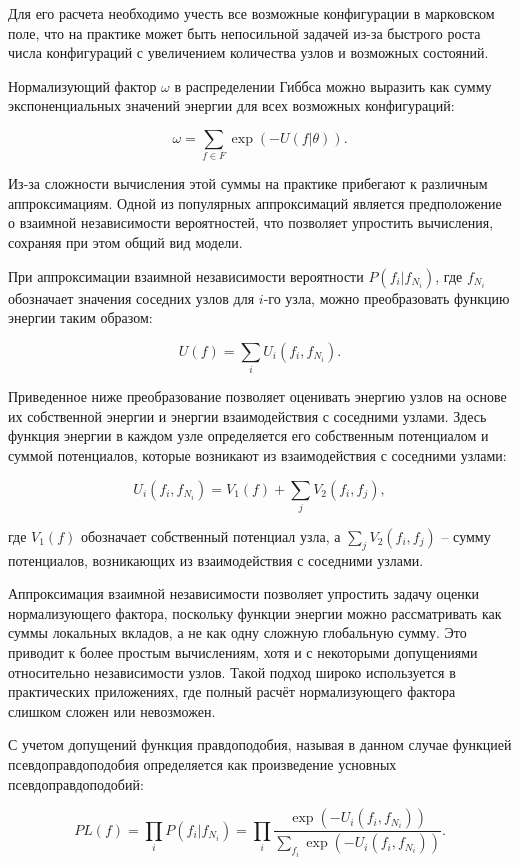 Для его расчета необходимо учесть все возможные конфигурации в марковском поле, что на практике может быть непосильной задачей из-за быстрого роста числа конфигураций с увеличением количества узлов и возможных состояний.

Нормализующий фактор $\omega$ в распределении Гиббса можно выразить как сумму экспоненциальных значений энергии для всех возможных конфигураций:

$$\omega = \sum\limits_{f \in F} \exp (-U(f | \theta)).$$

Из-за сложности вычисления этой суммы на практике прибегают к различным аппроксимациям. Одной из популярных аппроксимаций является предположение о взаимной независимости вероятностей, что позволяет упростить вычисления, сохраняя при этом общий вид модели.

При аппроксимации взаимной независимости вероятности $P(f_i | f_{N_i})$, где $f_{N_i}$ обозначает значения соседних узлов для $i$-го узла, можно преобразовать функцию энергии таким образом:

$$U(f) = \sum\limits_i U_i (f_i, f_{N_i}).$$

Приведенное ниже преобразование позволяет оценивать энергию узлов на основе их собственной энергии и энергии взаимодействия с соседними узлами. Здесь функция энергии в каждом узле определяется его собственным потенциалом и суммой потенциалов, которые возникают из взаимодействия с соседними узлами:

$$U_i (f_i, f_{N_i}) = V_1(f) + \sum\limits_j V_2 (f_i, f_j),$$

где $V_1(f)$ обозначает собственный потенциал узла, а $\sum\limits_j V_2 (f_i, f_j)$ -- сумму потенциалов, возникающих из взаимодействия с соседними узлами.

Аппроксимация взаимной независимости позволяет упростить задачу оценки нормализующего фактора, поскольку функции энергии можно рассматривать как суммы локальных вкладов, а не как одну сложную глобальную сумму. Это приводит к более простым вычислениям, хотя и с некоторыми допущениями относительно независимости узлов. Такой подход широко используется в практических приложениях, где полный расчёт нормализующего фактора слишком сложен или невозможен.

С учетом допущений функция правдоподобия, называя в данном случае функцией псевдоправдоподобия определяется как произведение усновных псевдоправдоподобий:

$$PL (f) = \prod\limits_i P(f_i | f_{N_i}) = \prod\limits_i \dfrac {\exp (-U_i (f_i, f_{N_i}))} {\sum\limits_{f_i}\exp (-U_i (f_i, f_{N_i}))}.$$

